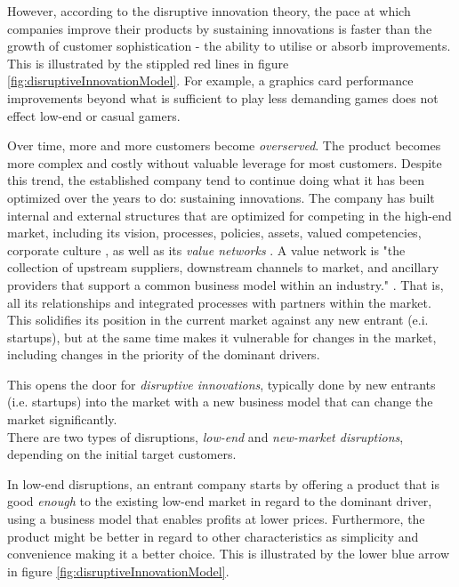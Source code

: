 \documentclass[a4paper,10pt]{book}
\begin{document}
However, according to the disruptive innovation theory, the pace at which companies improve their products by sustaining innovations is faster than 
the growth of customer sophistication - the ability to utilise or absorb improvements. 
This is illustrated by the stippled red lines in figure \ref{fig:disruptiveInnovationModel}. For example, a graphics card performance improvements
beyond what is sufficient to play less demanding games does not effect low-end or casual gamers.

Over time, more and more customers become \emph{overserved}. The product becomes more complex and costly without valuable leverage for most customers. 
Despite this trend, the established company tend to continue doing what it has been optimized over the years to do: sustaining innovations.
The company has built internal and external structures that are optimized for competing in the high-end market, 
including its vision, processes, policies, assets, valued competencies, corporate culture \cite{scientificArticlePredictingTheUnpredictable}, 
as well as its \emph{value networks} \cite{innovatorsDilemma}.
A value network is "the collection of upstream suppliers, downstream channels to market, 
  and ancillary providers that support a common business model within an industry." \cite{innovatorsDilemma}. 
That is, all its relationships and integrated processes with partners within the market.
This solidifies its position in the current market against any new entrant (e.i. startups), 
but at the same time makes it vulnerable for changes in the market, including changes in the priority of the dominant drivers.


This opens the door for \emph{disruptive innovations}, typically done by new entrants (i.e. startups) into the market with a new business model 
that can change the market significantly. \\

There are two types of disruptions, \emph{low-end} and \emph{new-market disruptions}, depending on the initial target customers.

In low-end disruptions, an entrant company starts by offering a product that is good \emph{enough} to the existing low-end market in regard
to the dominant driver, using a business model that enables profits at lower prices. 
Furthermore, the product might be better in regard to other characteristics as simplicity and convenience \cite{innovatorsSolution} 
making it a better choice.
This is illustrated by the lower blue arrow in figure \ref{fig:disruptiveInnovationModel}.
\end{document}
